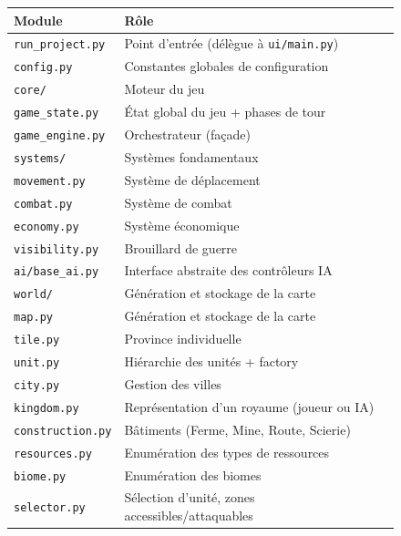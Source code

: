 \documentclass[12pt, a4paper]{article}
\begin{document}
\begin{figure}[H]
    \begin{center}
    \begin{tabular}{ll}
    \toprule
    \textbf{Module} & \textbf{Rôle} \\
    \midrule
    \texttt{run\_project.py} & Point d'entrée (délègue à \texttt{ui/main.py}) \\
    \texttt{config.py} & Constantes globales de configuration \\
    \texttt{core/} & Moteur du jeu \\
    \texttt{\phantom{core}game\_state.py} & État global du jeu + phases de tour \\
    \texttt{\phantom{core}game\_engine.py} & Orchestrateur (façade) \\
    \texttt{\phantom{core}systems/} & Systèmes fondamentaux \\
    \texttt{\phantom{coresystems}movement.py} & Système de déplacement \\
    \texttt{\phantom{coresystems}combat.py} & Système de combat \\
    \texttt{\phantom{coresystems}economy.py} & Système économique \\
    \texttt{\phantom{coresystems}visibility.py} & Brouillard de guerre \\
    \texttt{\phantom{core}ai/base\_ai.py} & Interface abstraite des contrôleurs IA \\
    \texttt{world/} & Génération et stockage de la carte \\
    \texttt{\phantom{world}map.py} & Génération et stockage de la carte \\
    \texttt{\phantom{world}tile.py} & Province individuelle \\
    \texttt{\phantom{world}unit.py} & Hiérarchie des unités + factory \\
    \texttt{\phantom{world}city.py} & Gestion des villes \\
    \texttt{\phantom{world}kingdom.py} & Représentation d'un royaume (joueur ou IA) \\
    \texttt{\phantom{world}construction.py} & Bâtiments (Ferme, Mine, Route, Scierie) \\
    \texttt{\phantom{world}resources.py} & Enumération des types de ressources \\
    \texttt{\phantom{world}biome.py} & Enumération des biomes \\
    \texttt{\phantom{world}selector.py} & Sélection d'unité, zones accessibles/attaquables \\

\end{tabular}
\end{center}
\end{figure}
\end{document}
